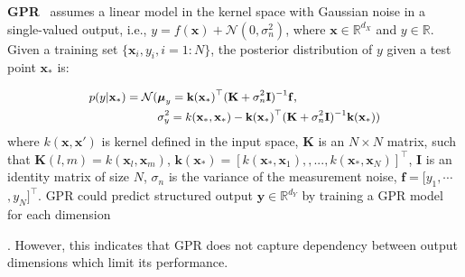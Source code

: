 \textbf{GPR}~\cite{Rasmussen:2005}  assumes a linear model in the kernel space with Gaussian noise in a single-valued output, i.e., $y = f(\textbf{x})  + \mathcal{N} (0, \sigma_{n}^2)$, where $\textbf{x} \in \mathbb{R}^{d_X}$ and ${y} \in \mathbb{R}$. Given a training set $\lbrace \textbf{x}_i, {y}_i , i =1:N \rbrace$, the posterior distribution of $y$ given a test point $\textbf{x}_{*}$ is:   
\begin{comment}
\begin{equation}
y_i = f_i(t) +e_i ,  \,\,\,\,     e_i ∼ \mathcal{N} (0, \sigma_{ni}^2),        
\end{equation}
\end{comment}
\begin{equation}
\small
\begin{split}
p(y|\textbf{x}_*)=   \mathcal{N} (&\boldsymbol{\mu}_{y} =  \textbf{k}{(\textbf{x}_*)}^\top (\textbf{K} + \sigma^2_{n} \textbf{I})^{-1} \mathbf{f},   \\  &  \sigma_{y}^2 = k({\textbf{x}_*, \textbf{x}_*}) -\textbf{k}{(\textbf{x}_*)}^\top (\textbf{K} + \sigma^2_{n} \textbf{I})^{-1} \textbf{k}{(\textbf{x}_*)})
\end{split}
\label{eq:gprpred}
\end{equation}
where $k(\textbf{x},\textbf{x}')$ is kernel defined in the input space, $\mathbf{K}$ is an $N \times N$ matrix, such that $\mathbf{K} (l,m) = k(\textbf{x}_l, \textbf{x}_m)$, $\textbf{k}{(\textbf{x}_*)}  = [k(\textbf{x}_*,\textbf{x}_1),, ..., {k}(\textbf{x}_*,\textbf{x}_{N})]^\top$, $\textbf{I}$ is an  identity matrix of size $N$, $\sigma_{n}$ is the variance of the measurement noise, $\mathbf{f} = [y_1,\cdots  $ $, y_N]^\top$. GPR could predict structured output $\textbf{y} \in \mathbb{R}^{d_Y}$ by training a GPR  model for each dimension. However, this indicates that GPR does not capture dependency between output dimensions which limit its performance. 

